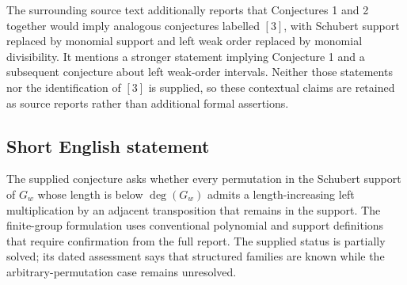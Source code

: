 \documentclass[11pt]{article}
\begin{document}
The surrounding source text additionally reports that Conjectures 1 and 2 together would imply analogous conjectures labelled \([3]\), with Schubert support replaced by monomial support and left weak order replaced by monomial divisibility. It mentions a stronger statement implying Conjecture 1 and a subsequent conjecture about left weak-order intervals. Neither those statements nor the identification of \([3]\) is supplied, so these contextual claims are retained as source reports rather than additional formal assertions.
\subsection{Short English statement}
The supplied conjecture asks whether every permutation in the Schubert support of \(G_w\) whose length is below \(\deg(G_w)\) admits a length-increasing left multiplication by an adjacent transposition that remains in the support. The finite-group formulation uses conventional polynomial and support definitions that require confirmation from the full report. The supplied status is partially solved; its dated assessment says that structured families are known while the arbitrary-permutation case remains unresolved.
\end{document}
